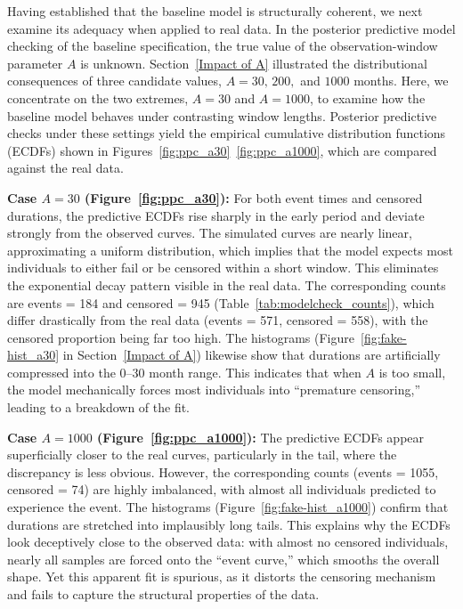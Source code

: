 Having established that the baseline model is structurally coherent, we next examine its adequacy when applied to real data. In the posterior predictive model checking of the baseline specification, the true value of the observation-window parameter $A$ is unknown. Section~\ref{Impact of A} illustrated the distributional consequences of three candidate values, $A=30, \,200,$ and $1000$ months. Here, we concentrate on the two extremes, $A=30$ and $A=1000$, to examine how the baseline model behaves under contrasting window lengths. Posterior predictive checks under these settings yield the empirical cumulative distribution functions (ECDFs) shown in Figures~\ref{fig:ppc_a30}~\ref{fig:ppc_a1000}, which are compared against the real data.

\textbf{Case $A=30$ (Figure~\ref{fig:ppc_a30}):} For both event times and censored durations, the predictive ECDFs rise sharply in the early period and deviate strongly from the observed curves. The simulated curves are nearly linear, approximating a uniform distribution, which implies that the model expects most individuals to either fail or be censored within a short window. This eliminates the exponential decay pattern visible in the real data. The corresponding counts are events = 184 and censored = 945 (Table~\ref{tab:modelcheck_counts}), which differ drastically from the real data (events = 571, censored = 558), with the censored proportion being far too high. The histograms (Figure~\ref{fig:fake-hist_a30} in Section~\ref{Impact of A}) likewise show that durations are artificially compressed into the 0–30 month range. This indicates that when $A$ is too small, the model mechanically forces most individuals into “premature censoring,” leading to a breakdown of the fit.

\textbf{Case $A=1000$ (Figure~\ref{fig:ppc_a1000}):} The predictive ECDFs appear superficially closer to the real curves, particularly in the tail, where the discrepancy is less obvious. However, the corresponding counts (events = 1055, censored = 74) are highly imbalanced, with almost all individuals predicted to experience the event. The histograms (Figure~\ref{fig:fake-hist_a1000}) confirm that durations are stretched into implausibly long tails. This explains why the ECDFs look deceptively close to the observed data: with almost no censored individuals, nearly all samples are forced onto the “event curve,” which smooths the overall shape. Yet this apparent fit is spurious, as it distorts the censoring mechanism and fails to capture the structural properties of the data.

